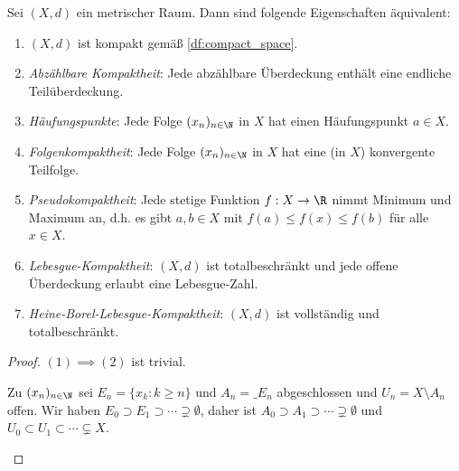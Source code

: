 \begin{st}
	Sei $(X,d)$ ein metrischer Raum.
	Dann sind folgende Eigenschaften äquivalent:
	\begin{enumerate}[(1)]
		\item
			$(X,d)$ ist kompakt gemäß \ref{df:compact_space}.
		\item
			\emph{Abzählbare Kompaktheit}: Jede abzählbare Überdeckung enthält eine endliche Teilüberdeckung.
		\item
			\emph{Häufungspunkte}: Jede Folge $(x_n)_{n\in \N}$ in $X$ hat einen Häufungspunkt $a \in X$.
		\item
			\emph{Folgenkompaktheit}: Jede Folge $(x_n)_{n\in \N}$ in $X$ hat eine (in $X$) konvergente Teilfolge.
		\item
			\emph{Pseudokompaktheit}: Jede stetige Funktion $f: X \to \R$ nimmt Minimum und Maximum an, d.h. es gibt $a,b \in X$ mit $f(a) \le f(x) \le f(b)$ für alle $x \in X$.
		\item
			\emph{Lebesgue-Kompaktheit}: $(X,d)$ ist totalbeschränkt und jede offene Überdeckung erlaubt eine Lebesgue-Zahl.
		\item
			\emph{Heine-Borel-Lebesgue-Kompaktheit}: $(X,d)$ ist vollständig und totalbeschränkt.
	\end{enumerate}
	\begin{proof}
		$(1) \implies (2)$ ist trivial.
		\begin{seg}[$(2) \implies (3)$]
			Zu $(x_n)_{n\in\N}$ sei $E_n = \{x_k : k \ge n\}$ und $A_n = \_{E_n}$ abgeschlossen und $U_n = X \setminus A_n$ offen.
			Wir haben $E_0 \supset E_1 \supset \dotsb \supsetneq \emptyset$, daher ist $A_0 \supset A_1 \supset \dotsb \supsetneq \emptyset$ und $U_0 \subset U_1 \subset \dotsb \subsetneq X$.


\end{seg}
\end{proof}
\end{st}
